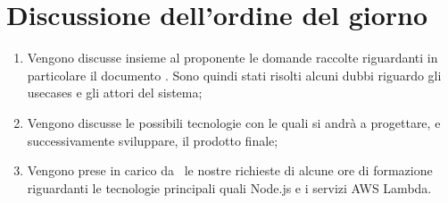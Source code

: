 \documentclass[../verbale-2017-02-07.tex]{subfiles}
\begin{document}
	\section{Discussione dell'ordine del giorno}
	\begin{enumerate}
		\item Vengono discusse insieme al proponente le domande raccolte riguardanti in particolare il documento \analisideirequisitiRR. Sono quindi stati risolti alcuni dubbi riguardo gli usecases e gli attori del sistema;
		\item Vengono discusse le possibili tecnologie con le quali si andrà a progettare, e successivamente sviluppare, il prodotto finale;
		\item Vengono prese in carico da \prop\ le nostre richieste di alcune ore di formazione riguardanti le tecnologie principali quali Node.js e i servizi AWS Lambda.
	\end{enumerate}
\end{document}
